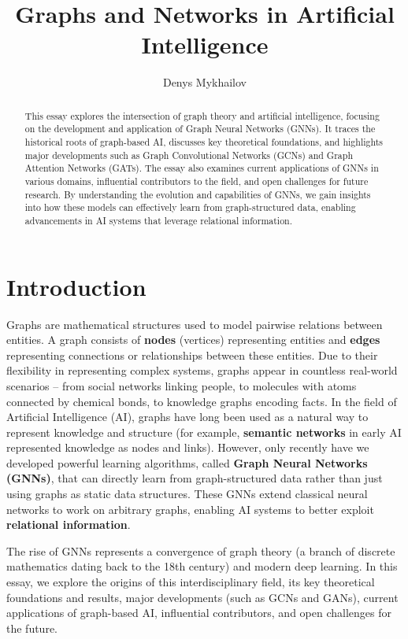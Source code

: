 \documentclass{article}
\title{Graphs and Networks in Artificial Intelligence}
\author{Denys Mykhailov}
\begin{document}
\maketitle

\begin{abstract}

      This essay explores the intersection of graph theory and artificial intelligence, focusing on the development and application of Graph Neural Networks (GNNs).
      It traces the historical roots of graph-based AI, discusses key theoretical foundations, and highlights major developments such as Graph Convolutional Networks (GCNs) and Graph Attention Networks (GATs).
      The essay also examines current applications of GNNs in various domains, influential contributors to the field, and open challenges for future research.
      By understanding the evolution and capabilities of GNNs, we gain insights into how these models can effectively learn from graph-structured data, enabling advancements in AI systems that leverage relational information.

\end{abstract}

\section{Introduction}

Graphs are mathematical structures used to model pairwise relations between entities.
A graph consists of \textbf{nodes} (vertices) representing entities and \textbf{edges} representing connections or relationships between these entities.
Due to their flexibility in representing complex systems, graphs appear in countless real-world scenarios – from social networks linking people, to molecules with atoms connected by chemical bonds, to knowledge graphs encoding facts.
In the field of Artificial Intelligence (AI), graphs have long been used as a natural way to represent knowledge and structure (for example, \textbf{semantic networks} in early AI represented knowledge as nodes and links).
However, only recently have we developed powerful learning algorithms, called \textbf{Graph Neural Networks (GNNs)}, that can directly learn from graph-structured data rather than just using graphs as static data structures.
These GNNs extend classical neural networks to work on arbitrary graphs, enabling AI systems to better exploit \textbf{relational information}.

The rise of GNNs represents a convergence of graph theory (a branch of discrete mathematics dating back to the 18th century) and modern deep learning.
In this essay, we explore the origins of this interdisciplinary field, its key theoretical foundations and results, major developments (such as GCNs and GANs), current applications of graph-based AI, influential contributors, and open challenges for the future.
\end{document}
